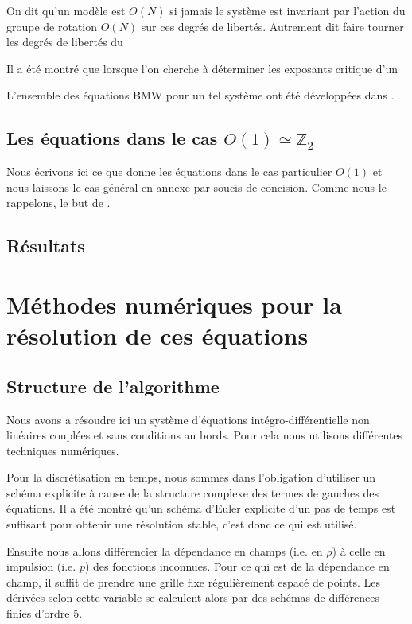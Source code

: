 \documentclass[10pt]{article}
\begin{document}
\begin{multicols}{2}
On dit qu'un modèle est $O(N)$ si jamais le système est invariant par l'action du groupe de rotation $O(N)$ sur ces degrés de libertés. Autrement dit faire tourner les degrés de libertés du 

Il a été montré \cite{Bellac2012} que lorsque l'on cherche à déterminer les exposants critique d'un 

L'ensemble des équations BMW pour un tel système ont été développées dans \cite{benitez2012nonperturbative}. 


\vspace*{11pt}
\subsection{Les équations dans le cas $O(1) \simeq \mathbb{Z}_2$}

Nous écrivons ici ce que donne les équations dans le cas particulier $O(1)$ et nous laissons le cas général en annexe par soucis de concision. Comme nous le rappelons, le but de . 



\vspace*{11pt}
\subsection{Résultats}
\lipsum[1]


\section{Méthodes numériques pour la résolution de ces équations}

\subsection{Structure de l'algorithme}

Nous avons a résoudre ici un système d'équations intégro-différentielle non linéaires couplées et sans conditions au bords. Pour cela nous utilisons différentes techniques numériques. 

Pour la discrétisation en temps, nous sommes dans l'obligation d'utiliser un schéma explicite à cause de la structure complexe des termes de gauches des équations. Il a été montré qu'un schéma d'Euler explicite d'un pas de temps est suffisant pour obtenir une résolution stable, c'est donc ce qui est utilisé. 

Ensuite nous allons différencier la dépendance en champs (i.e. en $\rho$) à celle en impulsion (i.e. $p$) des fonctions inconnues. Pour ce qui est de la dépendance en champ, il suffit de prendre une grille fixe régulièrement espacé de points. Les dérivées selon cette variable se calculent alors par des schémas de différences finies d'ordre 5. 


\end{multicols}
\end{document}
